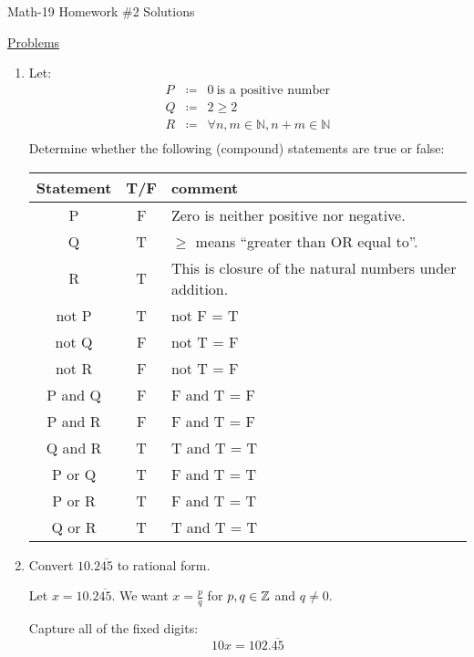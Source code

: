 \documentclass[letterpaper,12pt,fleqn]{article}
\begin{document}
\begin{center}
\Large Math-19 Homework \#2 Solutions
\end{center}

\vspace{0.5in}

\underline{Problems}

\begin{enumerate}
\item Let:
\begin{eqnarray*}
P &\coloneqq& 0\ \mbox{is a positive number} \\
Q &\coloneqq& 2\ge2 \\
R &\coloneqq& \forall n,m\in\mathbb{N}, n+m\in\mathbb{N} \\
\end{eqnarray*}
Determine whether the following (compound) statements are true or false:

\begin{tabular}{|c|c|l|}
  \hline
  Statement & T/F & comment \\
  \hline
  P & F & Zero is neither positive nor negative. \\
  \hline
  Q & T & $\ge$ means ``greater than OR equal to''. \\
  \hline
  R & T & This is closure of the natural numbers under addition. \\
  \hline
  not P & T & not F = T \\
  \hline
  not Q & F & not T = F \\
  \hline
  not R & F & not T = F \\
  \hline
  P and Q & F & F and T = F \\
  \hline
  P and R & F & F and T = F \\
  \hline
  Q and R & T & T and T = T\\
  \hline
  P or Q & T & F and T = T \\
  \hline
  P or R & T & F and T = T \\
  \hline
  Q or R & T & T and T = T \\
  \hline
\end{tabular}

\bigskip

\item Convert $10.2\overline{45}$ to rational form.

  Let $x=10.2\overline{45}$. We want $x=\frac{p}{q}$ for $p,q\in\mathbb{Z}$ and
  $q\ne0$.
  
  Capture all of the fixed digits:
  \[10x=102.\overline{45}\]


\end{enumerate}
\end{document}
